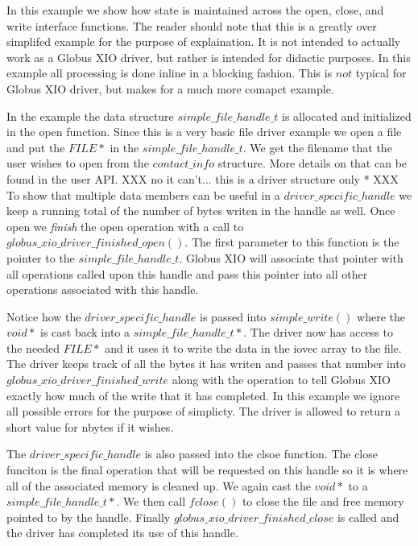 \documentclass[11pt]{article}
\begin{document}
In this example we show how state is maintained across the open, close,
and write interface functions.  The reader should note that this is
a greatly over simplifed example for the purpose of explaination.  It is
not intended to actually work as a Globus XIO driver, but rather is intended
for didactic purposes.  In this example all processing is done inline in a
blocking fashion.  This is $not$ typical for Globus XIO driver, but makes for
a much more comapct example.

In the example the data structure $simple\_file\_handle\_t$ is allocated
and initialized in the open function.  Since this is a very basic file
driver example we open a file and put the $FILE *$ in the 
$simple\_file\_handle\_t$.  We get the filename that the user wishes to
open from the $contact\_info$ structure.  More details on that can be found
in the user API. XXX no it can't... this is a driver structure only * XXX
To show that multiple data members can be useful in a
$driver\_specific\_handle$
we keep a running total of the number of bytes writen in the handle as well.
Once open we \emph{finish} the open operation with a call to
$globus\_xio\_driver\_finished\_open()$.  The first parameter to this function
is the pointer to the $simple\_file\_handle\_t$.  Globus XIO will associate
that pointer with all operations called upon this handle and pass this 
pointer into all other operations associated with this handle.

Notice how the $driver\_specific\_handle$ is passed into $simple\_write()$
where the $void *$ is cast back into a $simple\_file\_handle\_t *$.  The
driver now has access to the needed $FILE *$ and it uses it to write the 
data in the iovec array to the file.  The driver keeps track of all
the bytes it has writen and passes that number into 
$globus\_xio\_driver\_finished\_write$ along with the operation to 
tell Globus XIO exactly how much of the write that it has completed.  
In this example we ignore all possible errors for the purpose of simplicty.
The driver is allowed to return a short value for nbytes if it wishes.

The $driver\_specific\_handle$ is also passed into the clsoe function.
The close funciton is the final operation that will be requested on this 
handle so it is where all of the associated memory is cleaned up.  We
again cast the $void *$ to a $simple\_file\_handle\_t *$.  We then call 
$fclose()$ to close the file and free memory pointed to by the handle.
Finally $globus\_xio\_driver\_finished\_close$ is called and the driver has 
completed its use of this handle.
\end{document}

